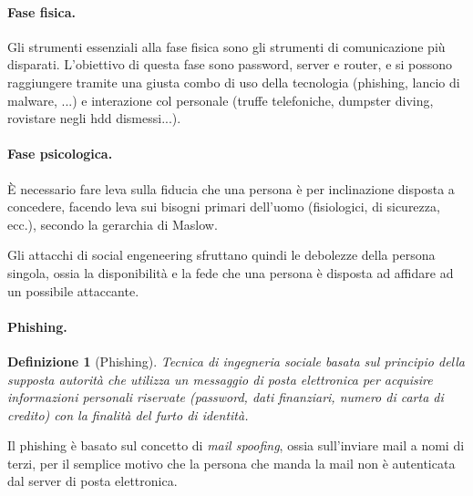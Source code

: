 \documentclass[a4paper, 11pt]{article}
\newtheorem{definit}{Definizione}[subsection]
\begin{document}
	\paragraph{Fase fisica.} Gli strumenti essenziali alla fase fisica sono gli strumenti di comunicazione più disparati. L'obiettivo di questa fase sono password, server e router, e si possono raggiungere tramite una giusta combo di uso della tecnologia (phishing, lancio di malware, ...) e interazione col personale (truffe telefoniche, dumpster diving, rovistare negli hdd dismessi...).
	
	\paragraph{Fase psicologica.} È necessario fare leva sulla fiducia che una persona è per inclinazione disposta a concedere, facendo leva sui bisogni primari dell'uomo (fisiologici, di sicurezza, ecc.), secondo la gerarchia di Maslow. 
	
	Gli attacchi di social engeneering sfruttano quindi le debolezze della persona singola, ossia la disponibilità e la fede che una persona è disposta ad affidare ad un possibile attaccante.
	
	\paragraph{Phishing.} \begin{definit}[Phishing]
		Tecnica di ingegneria sociale basata sul principio della supposta autorità che utilizza un messaggio di posta elettronica per acquisire informazioni personali riservate (password, dati finanziari, numero di carta di credito) con la finalità del furto di identità.
	\end{definit}

	Il phishing è basato sul concetto di \textit{mail spoofing}, ossia sull'inviare mail a nomi di terzi, per il semplice motivo che la persona che manda la mail non è autenticata dal server di posta elettronica.
	
	
	
	
	
	
	
	
	
	
\end{document}

